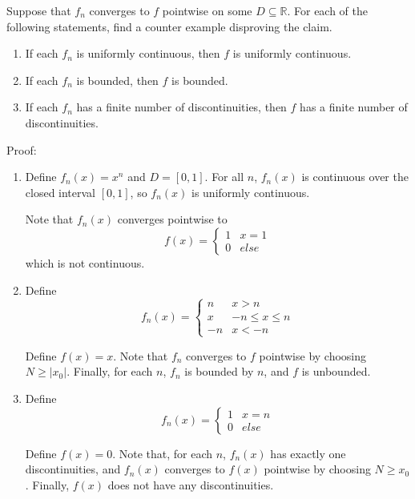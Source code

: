 \documentclass{article}
\begin{document}
Suppose that $f_n$ converges to $f$ pointwise on some $D\subseteq \mathbb{R}$.  For each of the following statements, find a counter example disproving the claim.
\begin{enumerate}
\item If each $f_n$ is uniformly continuous, then $f$ is uniformly continuous.
\item If each $f_n$ is bounded, then $f$ is bounded.
\item If each $f_n$ has a finite number of discontinuities, then $f$ has a finite number of discontinuities.
\end{enumerate}

Proof: 
\begin{enumerate}
    \item Define $f_n(x) = x^n$ and $D = [0,1]$. For all $n$, $f_n(x)$ is continuous over the closed interval $[0,1]$, so $f_n(x)$ is uniformly continuous.

    Note that $f_n(x)$ converges pointwise to \[f(x) = \begin{cases} 1 & x = 1 \\ 0 & \textit{else}\end{cases}\]which is not continuous. 

    \item Define \[f_n(x) = \begin{cases} n & x > n \\ x & -n \le x \le n \\ -n & x < -n \end{cases}\]

    Define $f(x) = x$. Note that $f_n$ converges to $f$ pointwise by choosing $N \geq |x_0|$. Finally, for each $n$, $f_n$ is bounded by $n$, and $f$ is unbounded.

    \item Define \[f_n(x) = \begin{cases} 1 & x=n \\ 0 &\textit{else} \end{cases} \]

    Define $f(x) = 0$. Note that, for each $n$, $f_n(x)$ has exactly one discontinuities, and $f_n(x)$ converges to $f(x)$ pointwise by choosing $N \geq x_0$. Finally, $f(x)$ does not have any discontinuities.

\end{enumerate}
\end{document}
